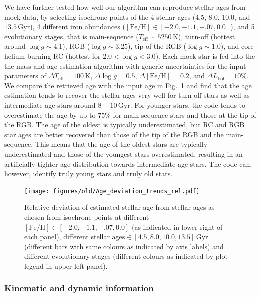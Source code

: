 \documentclass[fleqn,usenatbib,useAMS]{mnras}
\begin{document}
We have further tested how well our algorithm can reproduce stellar ages from mock data, by selecting isochrone points of the 4 stellar ages (4.5, 8.0, 10.0, and $13.5\,\mathrm{Gyr}$), 4 different iron abundances ($\mathrm{[Fe/H]} \in [-2.0,-1.1,-.07,0.0]$), and 5 evolutionary stages, that is main-sequence ($T_\text{eff} \sim 5250\,\mathrm{K}$), turn-off (hottest around $\log g \sim 4.1$), RGB ($\log g \sim 3.25$), tip of the RGB ($\log g \sim 1.0$), and core helium burning RC (hottest for $2.0 < \log g < 3.0$). Each mock star is fed into the the mass and age estimation algorithm with generic uncertainties for the input parameters of $\Delta T_\text{eff} = 100\,\mathrm{K}$, $\Delta \log g = 0.5$, $\Delta \mathrm{[Fe/H]} = 0.2$, and $\Delta L_\text{bol} = 10\%$. We compare the retrieved age with the input age in Fig.~\ref{fig:Age_deviation_trends} and find that the age estimation tends to recover the stellar ages very well for turn-off stars as well as intermediate age stars around $8-10\,\mathrm{Gyr}$. For younger stars, the code tends to overestimate the age by up to $75\%$ for main-sequence stars and those at the tip of the RGB. The age of the oldest is typically underestimated, but RC and RGB star ages are better recovered than those of the tip of the RGB and the main-sequence. This means that the age of the oldest stars are typically underestimated and those of the youngest stars overestimated, resulting in an artificially tighter age distribution towards intermediate age stars. The code can, however, identify truly young stars and truly old stars.

\begin{figure}
\centering
\texttt{[image: figures/old/Age\_deviation\_trends\_rel.pdf]}
  \caption[{Relative deviation of estimated stellar age from stellar ages as chosen from isochrone points.}]{Relative deviation of estimated stellar age from stellar ages as chosen from isochrone points at different $\mathrm{[Fe/H]} \in [-2.0, -1.1, -.07, 0.0]$ (as indicated in lower right of each panel), different stellar $\mathrm{ages} \in [4.5, 8.0, 10.0, 13.5]\,\mathrm{Gyr}$ (different bars with same colours as indicated by axis labels) and different evolutionary stages (different colours as indicated by plot legend in upper left panel).}
  \label{fig:Age_deviation_trends}
\end{figure}

\subsubsection{Kinematic and dynamic information}
\end{document}
